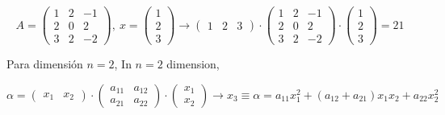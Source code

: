 \begin{equation*}
A=\begin{pmatrix}
1& 2& -1\\
2& 0& 2\\
3& 2& -2
\end{pmatrix}, \ x=\begin{pmatrix}
1\\
2\\
3
\end{pmatrix} \rightarrow \begin{pmatrix}
1& 2& 3
\end{pmatrix} \cdot \begin{pmatrix}
1& 2& -1\\
2& 0& 2\\
3& 2& -2
\end{pmatrix} \cdot \begin{pmatrix}
1\\
2\\
3
\end{pmatrix}= 21
\end{equation*}
\begin{paracol}{2}
Para dimensión $n=2$,
\switchcolumn
In $n=2$ dimension,
\end{paracol}
\begin{equation*}
\alpha =\begin{pmatrix}
x_1& x_2
\end{pmatrix}\cdot \begin{pmatrix}
a_{11}& a_{12}\\
a_{21}& a_{22}
\end{pmatrix}\cdot \begin{pmatrix}
x_1\\
x_2
\end{pmatrix} \rightarrow x_3\equiv \alpha=a_{11}x_1^2+(a_{12}+a_{21})x_1x_2+a_{22}x_2^2
\end{equation*}

